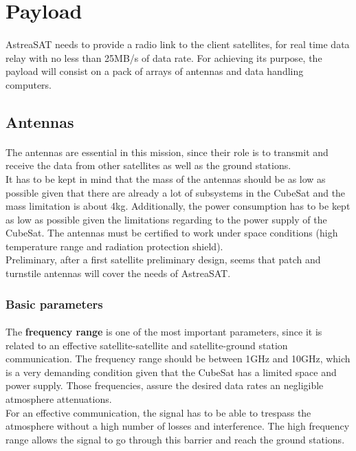 \section{Payload}
\paragraph{}AstreaSAT needs to provide a radio link to the client satellites, for real time data relay with no less than 25MB/s of data rate. For achieving its purpose, the payload will consist on a pack of arrays of antennas and data handling computers.

\subsection{Antennas}
\paragraph{}The antennas are essential in this mission, since their role is to transmit and receive the data from other satellites as well as the ground stations. \\
It has to be kept in mind that the mass of the antennas should be as low as possible given that there are already a lot of subsystems in the CubeSat and the mass limitation is about 4kg.
Additionally, the power consumption has to be kept as low as possible given the limitations regarding to the power supply of the CubeSat. The antennas must be certified to work under space conditions (high temperature range and radiation protection shield).\\
Preliminary, after a first satellite preliminary design, seems that patch and turnstile antennas will cover the needs of AstreaSAT.  

\subsubsection{Basic parameters}
\paragraph{}The \textbf{frequency range} is one of the most important parameters, since it is related to an effective satellite-satellite and satellite-ground station communication. The frequency range should be between 1GHz and 10GHz, which is a very demanding condition given that the CubeSat has a limited space and power supply. Those frequencies, assure the desired data rates an negligible atmosphere attenuations. \\
For an effective communication, the signal has to be able to trespass the atmosphere without a high number of losses and interference. The high frequency range allows the signal to go through this barrier and reach the ground stations.

